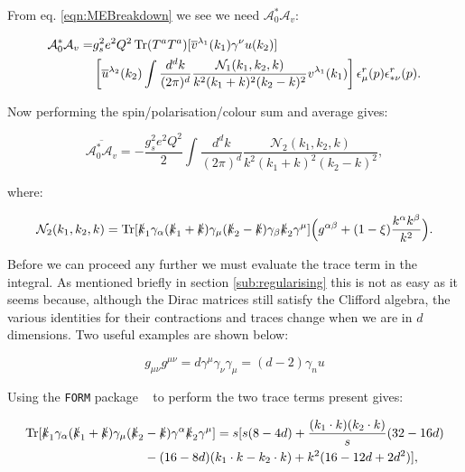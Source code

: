 			From eq. \eqref{eqn:MEBreakdown} we see we need $\mathcal{A}_0^*\mathcal{A}_v$:

			\begin{align}
				\mathcal{A}_0^*\mathcal{A}_v = &g_s^2e^2Q^2\operatorname{Tr}(T^aT^a)[\overline{v}^{\lambda_1}(k_1)\gamma^\nu u(k_2)]\\
				&\left[\overline{u}^{\lambda_2}(k_2)\int\frac{d^{d}k}{(2\pi)^{d}}\frac{\mathcal{N}_1(k_1, k_2, k)}
				{k^2(k_1+k)^2(k_2-k)^2}v^{\lambda_1}(k_1)\right]\epsilon^r_{\mu}(p)\epsilon^r_{*\nu}(p).
			\end{align}

			Now performing the spin/polarisation/colour sum and average gives:

			\begin{equation}
				\overline{\mathcal{A}_0^*\mathcal{A}_v} = -\frac{g_s^2e^2Q^2}{2}\int\frac{d^{d}k}
				{(2\pi)^{d}}\frac{\mathcal{N}_2(k_1, k_2,k)}{k^2(k_1+k)^2(k_2-k)^2},
			\end{equation}

			where:

			\begin{equation}
				\mathcal{N}_2(k_1, k_2, k) = \operatorname{Tr}[\slashed k_1 \gamma_\alpha(\slashed k_1 + \slashed k)\gamma_\mu
				(\slashed k_2 - \slashed k)\gamma_\beta\slashed k_2\gamma^\mu]\Big(g^{\alpha\beta} + (1-\xi)\frac{k^\alpha k^\beta}{k^2}\Big).
			\end{equation}

			Before we can proceed any further we must evaluate the trace term in the integral.  As mentioned briefly in section
			\ref{sub:regularising} this is not as easy as it seems because, although the Dirac matrices still satisfy the Clifford
			algebra, the various identities for their contractions and traces change when we are in $d$ dimensions.  Two useful
			examples are shown below:

			\begin{subequations}
				\begin{equation}
				g_{\mu\nu}g^{\mu\nu} = d
				\end{equation}
				\begin{equation}
				\gamma^\mu\gamma_\nu\gamma_\mu = (d-2)\gamma_nu
				\end{equation}
			\end{subequations}

			Using the \texttt{FORM} package ~\cite{form} to perform the two trace terms present gives:

			\begin{equation}
				\begin{split}
				\operatorname{Tr}[\slashed k_1 \gamma_\alpha(\slashed k_1 + \slashed k)\gamma_\mu(\slashed k_2 &-
				\slashed k)\gamma^\alpha\slashed k_2\gamma^\mu] = s[s(8-4d) + \frac{(k_1\cdot k)(k_2\cdot k)}{s}(32-16d) \\
				&- (16-8d)(k_1\cdot k - k_2\cdot k) + k^2(16-12d+2d^2)],
				\end{split}
			\end{equation}

